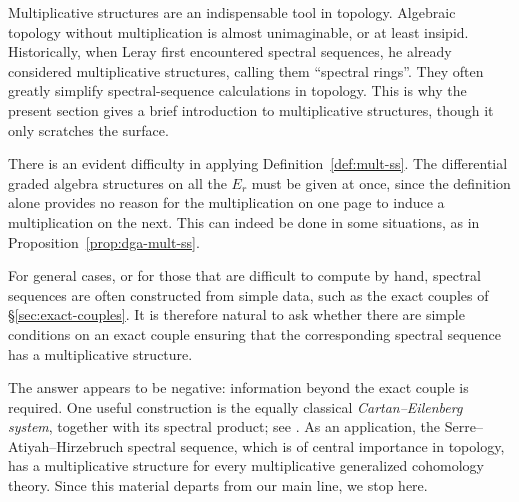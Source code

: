 \begin{remark}
	Multiplicative structures are an indispensable tool in topology. Algebraic
	topology without multiplication is almost unimaginable, or at least
	insipid. Historically, when Leray first encountered spectral sequences, he
	already considered multiplicative structures, calling them ``spectral
	rings''. They often greatly simplify spectral-sequence calculations in
	topology. This is why the present section gives a brief introduction to
	multiplicative structures, though it only scratches the surface.

	There is an evident difficulty in applying Definition~\ref{def:mult-ss}.
	The differential graded algebra structures on all the $E_r$ must be given
	at once, since the definition alone provides no reason for the
	multiplication on one page to induce a multiplication on the next. This can
	indeed be done in some situations, as in
	Proposition~\ref{prop:dga-mult-ss}.

	For general cases, or for those that are difficult to compute by hand,
	spectral sequences are often constructed from simple data, such as the exact
	couples of \S\ref{sec:exact-couples}. It is therefore natural to ask whether
	there are simple conditions on an exact couple ensuring that the corresponding
	spectral sequence has a multiplicative structure.

	The answer appears to be negative: information beyond the exact couple is
	required. One useful construction is the equally classical
	\emph{Cartan--Eilenberg system}, together with its spectral product; see
	\cite[II.A]{Dou58}. As an application, the Serre--Atiyah--Hirzebruch
	spectral sequence, which is of central importance in topology, has a
	multiplicative structure for every multiplicative generalized cohomology
	theory. Since this material departs from our main line, we stop here.
\end{remark}
